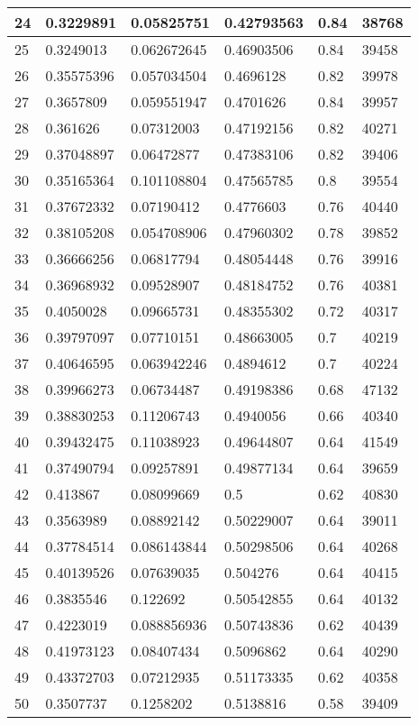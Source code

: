 \begin{longtable}{|l|l|l|l|l|l|}
24 & 0.3229891 & 0.05825751 & 0.42793563 & 0.84 & 38768 \\ \hline 
25 & 0.3249013 & 0.062672645 & 0.46903506 & 0.84 & 39458 \\ \hline 
26 & 0.35575396 & 0.057034504 & 0.4696128 & 0.82 & 39978 \\ \hline 
27 & 0.3657809 & 0.059551947 & 0.4701626 & 0.84 & 39957 \\ \hline 
28 & 0.361626 & 0.07312003 & 0.47192156 & 0.82 & 40271 \\ \hline 
29 & 0.37048897 & 0.06472877 & 0.47383106 & 0.82 & 39406 \\ \hline 
30 & 0.35165364 & 0.101108804 & 0.47565785 & 0.8 & 39554 \\ \hline 
31 & 0.37672332 & 0.07190412 & 0.4776603 & 0.76 & 40440 \\ \hline 
32 & 0.38105208 & 0.054708906 & 0.47960302 & 0.78 & 39852 \\ \hline 
33 & 0.36666256 & 0.06817794 & 0.48054448 & 0.76 & 39916 \\ \hline 
34 & 0.36968932 & 0.09528907 & 0.48184752 & 0.76 & 40381 \\ \hline 
35 & 0.4050028 & 0.09665731 & 0.48355302 & 0.72 & 40317 \\ \hline 
36 & 0.39797097 & 0.07710151 & 0.48663005 & 0.7 & 40219 \\ \hline 
37 & 0.40646595 & 0.063942246 & 0.4894612 & 0.7 & 40224 \\ \hline 
38 & 0.39966273 & 0.06734487 & 0.49198386 & 0.68 & 47132 \\ \hline 
39 & 0.38830253 & 0.11206743 & 0.4940056 & 0.66 & 40340 \\ \hline 
40 & 0.39432475 & 0.11038923 & 0.49644807 & 0.64 & 41549 \\ \hline 
41 & 0.37490794 & 0.09257891 & 0.49877134 & 0.64 & 39659 \\ \hline 
42 & 0.413867 & 0.08099669 & 0.5 & 0.62 & 40830 \\ \hline 
43 & 0.3563989 & 0.08892142 & 0.50229007 & 0.64 & 39011 \\ \hline 
44 & 0.37784514 & 0.086143844 & 0.50298506 & 0.64 & 40268 \\ \hline 
45 & 0.40139526 & 0.07639035 & 0.504276 & 0.64 & 40415 \\ \hline 
46 & 0.3835546 & 0.122692 & 0.50542855 & 0.64 & 40132 \\ \hline 
47 & 0.4223019 & 0.088856936 & 0.50743836 & 0.62 & 40439 \\ \hline 
48 & 0.41973123 & 0.08407434 & 0.5096862 & 0.64 & 40290 \\ \hline 
49 & 0.43372703 & 0.07212935 & 0.51173335 & 0.62 & 40358 \\ \hline 
50 & 0.3507737 & 0.1258202 & 0.5138816 & 0.58 & 39409 \\ \hline 
\end{longtable}